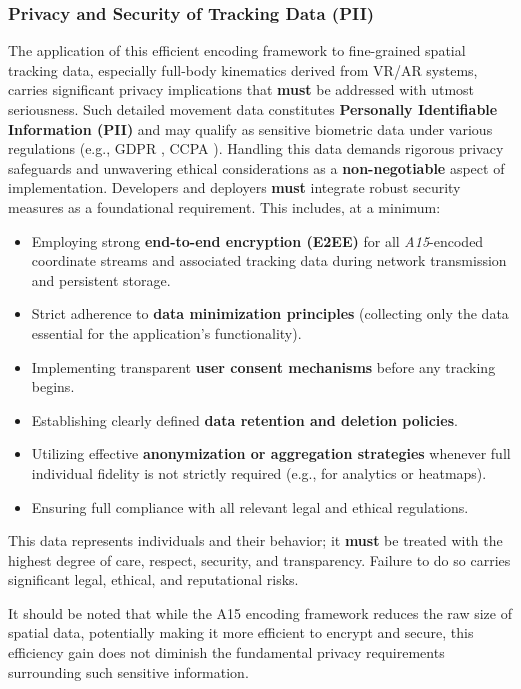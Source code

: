 \documentclass[10pt]{article}
\def\AAAB{\textit{A15}}
\begin{document}
\subsubsection{Privacy and Security of Tracking Data (PII)}\label{sec-privacy}

The application of this efficient encoding framework to fine-grained spatial tracking data, especially full-body kinematics derived from VR/AR systems, carries significant privacy implications that \textbf{must} be addressed with utmost seriousness. Such detailed movement data constitutes \textbf{Personally Identifiable Information (PII)} and may qualify as sensitive biometric data under various regulations (e.g., GDPR \cite{GDPR-2016}, CCPA \cite{CCPA-2018}). Handling this data demands rigorous privacy safeguards and unwavering ethical considerations as a \textbf{non-negotiable} aspect of implementation. Developers and deployers \textbf{must} integrate robust security measures as a foundational requirement. This includes, at a minimum:
\begin{itemize} \itemsep0pt
    \item Employing strong \textbf{end-to-end encryption (E2EE)} for all \AAAB{}-encoded coordinate streams and associated tracking data during network transmission and persistent storage.
    \item Strict adherence to \textbf{data minimization principles} (collecting only the data essential for the application's functionality).
    \item Implementing transparent \textbf{user consent mechanisms} before any tracking begins.
    \item Establishing clearly defined \textbf{data retention and deletion policies}.
    \item Utilizing effective \textbf{anonymization or aggregation strategies} whenever full individual fidelity is not strictly required (e.g., for analytics or heatmaps).
    \item Ensuring full compliance with all relevant legal and ethical regulations.
\end{itemize}
This data represents individuals and their behavior; it \textbf{must} be treated with the highest degree of care, respect, security, and transparency. Failure to do so carries significant legal, ethical, and reputational risks.

It should be noted that while the A15 encoding framework reduces the raw size of spatial data, potentially making it more efficient to encrypt and secure, this efficiency gain does not diminish the fundamental privacy requirements surrounding such sensitive information.
\end{document}
